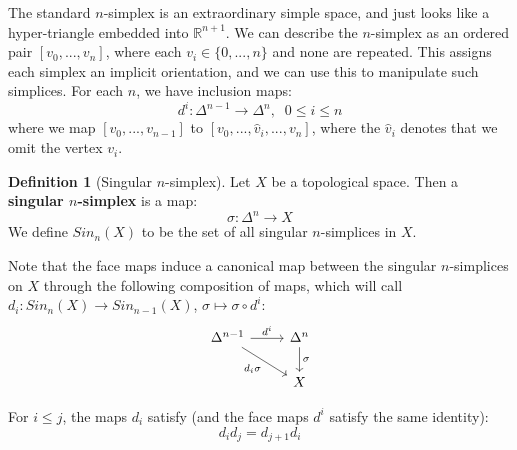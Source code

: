 \documentclass[12pt, oneside]{article}   	%
\theoremstyle{definition}
\newtheorem{definition}{Definition}[section]
\begin{document}
The standard $n$-simplex is an extraordinary simple space, and just looks like a hyper-triangle embedded 
into $\mathbb R^{n + 1}$. We can describe the $n$-simplex as an ordered pair $[v_0, ..., v_n]$, where 
each $v_i\in \{0, ..., n\}$ and none are repeated. This assigns each simplex an implicit orientation, and 
we can use this to manipulate such simplices. For each $n$, we have inclusion maps:
\begin{equation}
	d^i : \Delta^{n - 1}\rightarrow\Delta^n, \;\; 0\leq i\leq n
\end{equation}
where we map $[v_0, ..., v_{n - 1}]$ to $[v_0, ..., \hat v_i, ..., v_n]$, where the $\hat v_i$ denotes that we 
omit the vertex $v_i$. 

\begin{definition}[Singular $n$-simplex]
	Let $X$ be a topological space. Then a \textbf{singular $n$-simplex} is a map:
	\begin{equation}
		\sigma : \Delta^n\rightarrow X
	\end{equation}
	We define $Sin_n(X)$ to be the set of all singular $n$-simplices in $X$. 
\end{definition}

Note that the face maps induce a canonical map between the singular $n$-simplices on $X$ through the 
following composition of maps, which will call $d_i : Sin_n(X)\rightarrow Sin_{n - 1}(X)$, $\sigma\mapsto \sigma\circ d^i$:
\begin{equation}
	\begin{tikzcd}
		\Delta^{n - 1}\arrow[r, "d^i"]\arrow[dr, swap, "d_i\sigma"] & \Delta^n\arrow[d, "\sigma"] \\
		 & X
	\end{tikzcd}
\end{equation}

For $i\leq j$, the maps $d_i$ satisfy (and the face maps $d^i$ satisfy the same identity): 
\begin{equation}
	d_i d_j = d_{j + 1} d_i
\end{equation}
\end{document}

